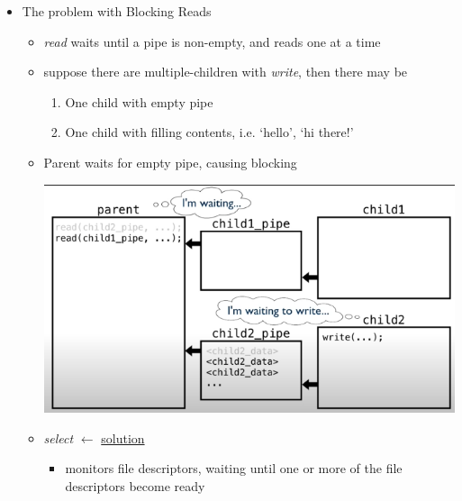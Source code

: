 \documentclass[12pt]{article}
\begin{document}
\begin{itemize}
    \item The problem with Blocking Reads
    \begin{itemize}
        \item \textit{read} waits until a pipe is non-empty, and reads one at a time
        \item suppose there are multiple-children with \textit{write}, then there may be
        \begin{enumerate}[1.]
            \item One child with empty pipe
            \item One child with filling contents, i.e. `hello', `hi there!'
        \end{enumerate}
        \item Parent waits for empty pipe, causing blocking

        \begin{center}
        \includegraphics[width=\linewidth]{images/week_10_notes_2_1.png}
        \end{center}
        \item \textit{select} $\leftarrow$ \underline{solution}
        \begin{itemize}
            \item monitors file descriptors, waiting until one or more of the file
            descriptors become ready
        \end{itemize}
    \end{itemize}
\end{itemize}

\bigskip
\end{document}
